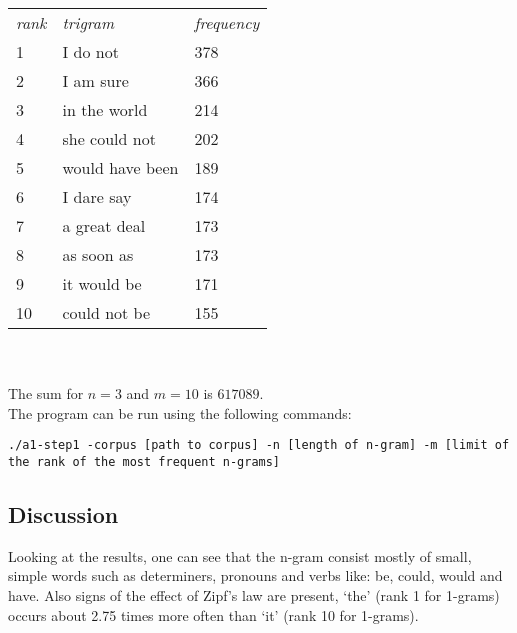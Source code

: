 \documentclass[a4paper, 10pt]{article}
\begin{document}
\begin{tabular}{l l l}
\textit{rank}&	\textit{trigram}	& \textit{frequency} \\
1	&	I do not		&	 378 \\
2	&	I am sure		&	 366 \\
3	&	in the world	&	 214 \\
4	&	she could not	&	 202 \\
5	&	would have been	&	 189 \\
6	&	I dare say		&	 174 \\
7	&	a great deal	&	 173 \\
8	&	as soon as		&	 173 \\
9	&	it would be		&	 171 \\
10	&	could not be	&	 155 \\
\end{tabular}\\
\\
The sum for $n = 3$ and $m = 10$ is $617089$.\\

The program can be run using the following commands:

\texttt{./a1-step1 -corpus [path to corpus] -n [length of n-gram] -m [limit of the rank of the most frequent n-grams]}

\subsection{Discussion}
Looking at the results, one can see that the n-gram consist mostly of small, simple words such as determiners, pronouns and verbs like: be, could, would and have. Also signs of the effect of Zipf’s law are present, ‘the’ (rank 1 for 1-grams) occurs about 2.75 times more often than ‘it’ (rank 10 for 1-grams).
\end{document}
